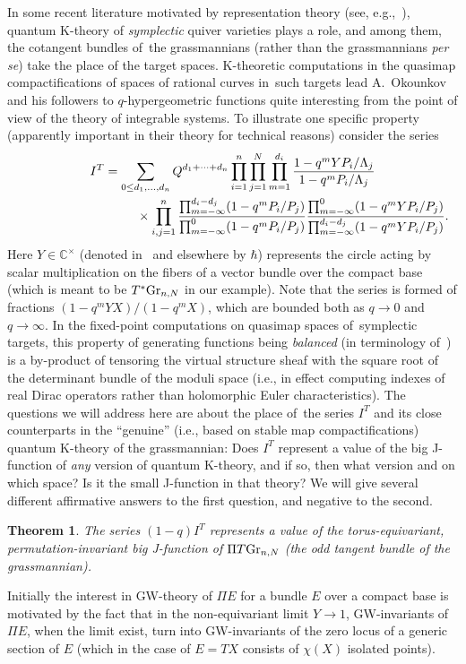 \documentclass[pdftex]{sigma}
\numberwithin{equation}{section}
\newtheorem{Theorem}{Theorem}[section]
\def\CC{\mathbb C}
\begin{document}
In some recent literature motivated by representation theory (see, e.g.,~\cite{KPSZ, Ok, PSZ}), quantum K-theory of {\em symplectic} quiver varieties plays a role, and among them, the cotangent bundles of~the grassmannians (rather than the grassmannians {\em per se}) take the place of the target spaces. K-theoretic computations in the quasimap compactifications of spaces of rational curves in~such targets lead A.~Okounkov and his followers to $q$-hypergeometric functions quite interesting from the point of view of the theory of integrable systems. To illustrate one specific property (appa\-rently important in their theory for technical reasons) consider the series
\begin{gather*}
I^T= \sum_{0\leq d_1,\dots,d_n}Q^{d_1+\cdots+d_n} \prod_{i=1}^n\prod_{j=1}^N\prod_{m=1}^{d_i}\frac{1-q^mYP_i/\Lambda_j} {1-q^mP_i/\Lambda_j}
\\ \hphantom{I^T=\sum_{0\leq d_1,\dots,d_n}Q^{d_1+\cdots} }
{}\times \prod_{i,j=1}^n\frac{\prod_{m=-\infty}^{d_i-d_j}(1-q^mP_i/P_j)}{\prod_{m=-\infty}^0(1-q^mP_i/P_j)}
\frac{\prod_{m=-\infty}^0(1-q^mY P_i/P_j)}{\prod_{m=-\infty}^{d_i-d_j}(1-q^mY P_i/P_j)}.
\end{gather*}
Here $Y\in \CC^{\times}$ (denoted in~\cite{Ok} and elsewhere by $\hbar$) represents the circle acting by scalar multiplication on the fibers of a vector bundle over the compact base (which is meant to be $T^*{\rm Gr}_{n,N}$ in our example). Note that the series is formed of fractions $(1-q^mY X)/(1-q^m X)$, which are bounded both as $q\to 0$ and $q\to \infty$. In the fixed-point computations on quasimap spaces of~symplectic targets, this property of generating functions being {\em balanced} (in terminology of~\cite{Liu}) is a by-product of tensoring the virtual structure sheaf with the square root of the determinant bundle of the moduli space (i.e., in effect computing indexes of real Dirac operators rather than holomorphic Euler characteristics). The questions we will address here are about the place of~the
series $I^T$ and its close counterparts in the ``genuine'' (i.e., based on stable map compactifications) quantum K-theory of the grassmannian: Does $I^T$ represent a value of the big J-function of {\em any} version of quantum K-theory, and if so, then what version and on which space? Is it the small J-function in that theory? We will give several different affirmative answers to the first question, and negative to the second.

\begin{Theorem}\label{thm4}
The series $(1-q) I^T$ represents a value of the torus-equivariant, permutation-invariant big J-function of $\Pi T {\rm Gr}_{n,N}$ (the odd tangent bundle of the grassmannian).
\end{Theorem}
Initially the interest in GW-theory of $\Pi E$ for a bundle $E$ over a compact base is motivated by the fact that in the non-equivariant limit $Y\to 1$, GW-invariants of $\Pi E$, when the limit exist, turn into GW-invariants of the zero locus of a generic section of $E$ (which in the case of $E=TX$ consists of $\chi (X)$ isolated points).
\end{document}
